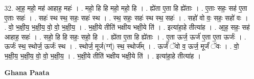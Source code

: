\documentclass[17pt]{extarticle}
\begin{document}
32. आ॒ह॒ महो॒ मह॑ आहाह॒ महः॑ । . महो॒ हि हि महो॒ महो॒ हि । . ह्ये॑ता ए॒ता हि ह्ये॑ताः । . ए॒ताः सहः॒ सह॑ ए॒ता ए॒ताः सहः॑ । . सहः॑ स्थ स्थ॒ सहः॒ सहः॑ स्थ । . स्थ॒ सहः॒ सहः॑ स्थ स्थ॒ सहः॑ । . सहो॑ वो वः॒ सहः॒ सहो॑ वः । . वो॒ भ॒क्षी॒य॒ भ॒क्षी॒य॒ वो॒ वो॒ भ॒क्षी॒य॒ । . भ॒क्षी॒ये तीति॑ भक्षीय भक्षी॒ये ति॑ । . इत्या॑हा॒हे तीत्या॑ह । . आ॒ह॒ सहः॒ सह॑ आहाह॒ सहः॑ । . सहो॒ हि हि सहः॒ सहो॒ हि । . ह्ये॑ता ए॒ता हि ह्ये॑ताः । . ए॒ता ऊर्ज॒ ऊर्ज॑ ए॒ता ए॒ता ऊर्जः॑ । . ऊर्जः॑ स्थ॒ स्थोर्ज॒ ऊर्जः॑ स्थ । . स्थोर्ज॒ मूर्ज(ग्ग्॑) स्थ॒ स्थोर्ज᳚म् । . ऊर्जं॑ ॅवो व॒ ऊर्ज॒ मूर्जं॑ ॅवः । . वो॒ भ॒क्षी॒य॒ भ॒क्षी॒य॒ वो॒ वो॒ भ॒क्षी॒य॒ । . भ॒क्षी॒ये तीति॑ भक्षीय भक्षी॒ये ति॑ । . इत्या॑हा॒हे तीत्या॑ह । \newline

\textbf{Ghana Paata } \newline
\end{document}

